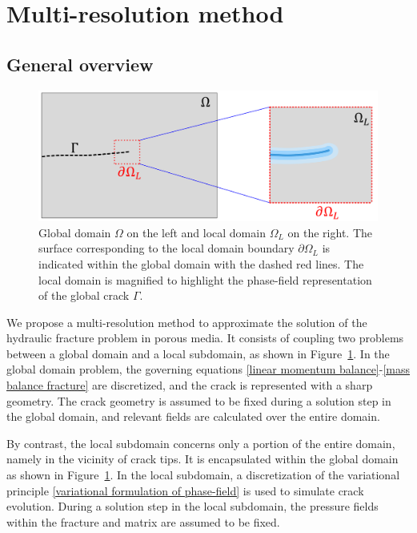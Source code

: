 \section{Multi-resolution method }\label{numerics}

\subsection{General overview}

\begin{figure}[!htbp]
    \centering
    \includegraphics[width=\textwidth]{img/Section2/global_local_simple.png}
    \caption{Global domain $\Omega$ on the left and local domain $\Omega_L$ on the right. The surface corresponding to the local domain boundary $\partial\Omega_L$ is indicated within the global domain with the dashed red lines.  The local domain is magnified to highlight the phase-field representation of the global crack $\Gamma$.}
    \label{fig:section_2_figure}
\end{figure}

We propose a multi-resolution method to approximate the solution of the hydraulic fracture problem in porous media. It consists of coupling two problems between a global domain and a local subdomain, as shown in Figure~\ref{fig:section_2_figure}.   In the global domain problem, the governing equations \eqref{linear momentum balance}-\eqref{mass balance fracture} are discretized, and the crack is represented with a sharp geometry.  The crack geometry is assumed to be fixed during a solution step in the global domain, and relevant fields are calculated over the entire domain.  

By contrast, the local subdomain concerns only a portion of the entire domain, namely in the vicinity of crack tips.  It is encapsulated within the global domain as shown in Figure~\ref{fig:section_2_figure}. In the local subdomain, a discretization of the variational principle \eqref{variational formulation of phase-field} is used to simulate crack evolution.  During a solution step in the local subdomain, the pressure fields within the fracture and matrix are assumed to be fixed.  

